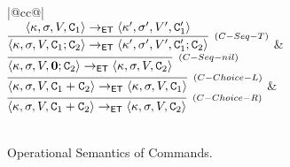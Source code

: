 \begin{figure}
\begin{tabular}{|@{}cc@{}|}
%
\\[8pt]
$
\infer[{\scriptstyle{(C-Seq-T)}}]
{\langle \hh, \thdstack, V, \cmd_1 ; \cmd_2 \rangle \rightarrow_{\ET} \langle \hh', \thdstack', V', \cmd_1' ; \cmd_2 \rangle}
{\langle \hh, \thdstack, V, \cmd_1 \rangle \rightarrow_{\ET} \langle \hh', \thdstack', V', \cmd_1' \rangle} 
$
&
$
\infer[{\scriptstyle{(C-Seq-nil)}}]
{\langle \hh, \thdstack, V, \nil ; \cmd_2 \rangle \rightarrow_{\ET} \langle \hh, \thdstack, V, \cmd_2 \rangle}
{} 
$
\\[8pt]
$
\infer[{\scriptstyle{(C-Choice-L)}}]
{\langle \hh, \thdstack, V, \cmd_1 + \cmd_2 \rangle \rightarrow_{\ET} \langle \hh, \thdstack, V, \cmd_1 \rangle}
{} 
$
&
$
\infer[{\scriptstyle{(C-Choice-R)}}]
{\langle \hh, \thdstack, V, \cmd_1 + \cmd_2 \rangle \rightarrow_{\ET} \langle \hh, \thdstack, V, \cmd_2 \rangle}
{} 
$
\\[8pt]
\\
\hline
\end{tabular}
\caption{Operational Semantics of Commands.}
\label{fig:opsem.cmd}
\end{figure}
%
%
%


